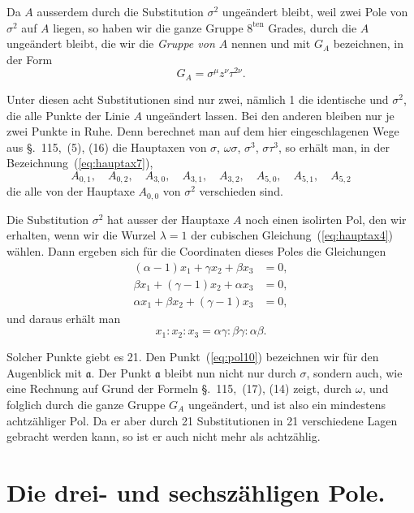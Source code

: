 \documentclass[12pt,a4paper]{article}
\begin{document}
Da $A$ ausserdem durch die Substitution $\sigma^2$ unge\"andert bleibt, weil zwei Pole von $\sigma^2$ auf $A$ liegen, so haben wir die ganze Gruppe $8^{\text{ten}}$ Grades, durch die $A$ unge\"andert bleibt, die wir die \textit{Gruppe von $A$} nennen und mit $G_A$ bezeichnen, in der Form
\begin{equation}
\label{eq:gruppeA} G_A = \sigma^{\mu} z^{\nu} \tau^{2\nu}.
\end{equation}

Unter diesen acht Substitutionen sind nur zwei, n\"amlich 1 die identische und $\sigma^2$, die alle Punkte der Linie $A$ unge\"andert lassen. Bei den anderen bleiben nur je zwei Punkte in Ruhe. Denn berechnet man auf dem hier eingeschlagenen Wege aus \S.~115,~(5), (16) die Hauptaxen von $\sigma$, $\omega\sigma$, $\sigma^3$, $\sigma\tau^3$, so erh\"alt man, in der Bezeichnung~(\ref{eq:hauptax7}),
\[A_{0,1}, \quad A_{0,2}, \quad A_{3,0}, \quad A_{3,1}, \quad A_{3,2}, \quad A_{5,0}, \quad A_{5,1}, \quad A_{5,2}\]
die alle von der Hauptaxe $A_{0,0}$ von $\sigma^2$ verschieden sind.

Die Substitution $\sigma^2$ hat ausser der Hauptaxe $A$ noch einen isolirten Pol, den wir erhalten, wenn wir die Wurzel $\lambda = 1$ der cubischen Gleichung~(\ref{eq:hauptax4}) w\"ahlen. Dann ergeben sich f\"ur die Coordinaten dieses Poles die Gleichungen
\begin{align*}
(\alpha - 1)x_1 + \gamma x_2 + \beta x_3 &= 0,\\
\beta x_1 + (\gamma - 1)x_2 + \alpha x_3 &= 0,\\
\alpha x_1 + \beta x_2 + (\gamma - 1)x_3 &= 0,
\end{align*}
und daraus erh\"alt man
\begin{equation}
\label{eq:pol10} x_1 : x_2 : x_3 = \alpha\gamma : \beta\gamma : \alpha\beta.
\end{equation}

Solcher Punkte giebt es 21. Den Punkt~(\ref{eq:pol10}) bezeichnen wir f\"ur den Augenblick mit $\mathfrak{a}$. Der Punkt $\mathfrak{a}$ bleibt nun nicht nur durch $\sigma$, sondern auch, wie eine Rechnung auf Grund der Formeln \S.~115,~(17), (14) zeigt, durch $\omega$, und folglich durch die ganze Gruppe $G_A$ unge\"andert, und ist also ein mindestens achtz\"ahliger Pol. Da er aber durch 21 Substitutionen in 21 verschiedene Lagen gebracht werden kann, so ist er auch nicht mehr als achtz\"ahlig.

\newpage
\section{Die drei- und sechsz\"ahligen Pole.}
\label{sec:119}
\end{document}
